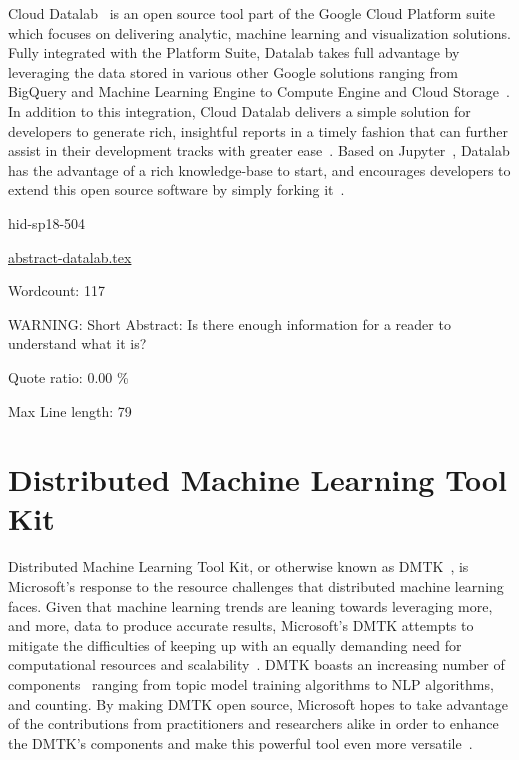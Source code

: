 Cloud Datalab~\cite{hid-sp18-504-google-datalab} is an open source tool 
part of the Google Cloud Platform suite which focuses on delivering analytic, 
machine learning and visualization solutions. Fully integrated with the 
Platform Suite, Datalab takes full advantage by leveraging the data stored 
in various other Google solutions ranging from BigQuery and Machine Learning 
Engine to Compute Engine and Cloud Storage~\cite{hid-sp18-504-google-datalab}. 
In addition to this integration, Cloud Datalab delivers a simple solution for 
developers to generate rich, insightful reports in a timely fashion that can 
further assist in their development tracks with greater
ease~\cite{hid-sp18-504-techcrunch-datalab}.  
Based on Jupyter~\cite{hid-sp18-504-google-datalab}, Datalab has the 
advantage of a rich knowledge-base to start, and encourages developers 
to extend this open source software by simply 
forking it~\cite{hid-sp18-504-techcrunch-datalab}.


\begin{IU}

hid-sp18-504

\href{https://github.com/cloudmesh-community/hid-sp18-504/blob/master//technology/abstract-datalab.tex}{abstract-datalab.tex}

 

Wordcount: 117

WARNING: Short Abstract: Is there enough information for a reader to understand what it is?


Quote ratio: 0.00 \%
 
Max Line length: 79
\end{IU}

\section{Distributed Machine Learning Tool Kit}

Distributed Machine Learning Tool Kit, or otherwise known as 
DMTK~\cite{hid-sp18-504-dmtk}, is Microsoft's response to the resource 
challenges that distributed machine learning faces. Given that machine 
learning trends are leaning towards leveraging more, and more, data to 
produce accurate results, Microsoft's DMTK attempts to mitigate the 
difficulties of keeping up with an equally demanding need for computational 
resources and scalability~\cite{hid-sp18-504-dmtk}. DMTK boasts an increasing 
number of components~\cite{hid-sp18-504-msresearch} ranging from topic 
model training algorithms to NLP algorithms, and counting. By making 
DMTK open source, Microsoft hopes to take advantage of the contributions 
from practitioners and researchers alike in order to enhance the DMTK's 
components and make this powerful tool even more 
versatile~\cite{hid-sp18-504-msresearch}.


